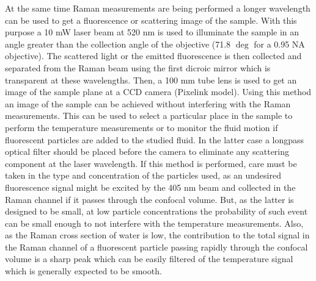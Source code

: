 \documentclass[twocolumn]{svjour3}       %
\begin{document}
 At the same time Raman measurements are being performed a longer wavelength can be used to get a fluorescence or scattering image of the sample. With this purpose a 10 mW laser beam at 520 nm is used to illuminate the sample in an angle greater than the collection angle of the objective (71.8 $\deg$ for a 0.95 NA objective). The scattered light or the emitted fluorescence is then collected and separated from the Raman beam using the first dicroic mirror which is transparent at these wavelengths. Then, a 100 mm tube lens is used to get an image of the sample plane at a CCD camera (Pixelink model). Using this method an image of the sample can be achieved without interfering with the Raman measurements. This can be used to select a particular place in the sample to perform the temperature measurements or to monitor the fluid motion if fluorescent particles are added to the studied fluid. In the latter case a longpass optical filter should be placed before the camera to eliminate any scattering component at the laser wavelength. If this method is performed, care must be taken in the type and concentration of the particles used, as an undesired fluorescence signal might be excited by the 405 nm beam and collected in the Raman channel if it passes through the confocal volume. But, as the latter is designed to be small, at low particle concentrations the probability of such event can be small enough to not interfere with the temperature measurements. Also, as the Raman cross section of water is low, the contribution to the total signal in the Raman channel of a fluorescent particle passing rapidly through the confocal volume is a sharp peak which can be easily filtered of the temperature signal which is generally expected to be smooth. 
 
\end{document}
